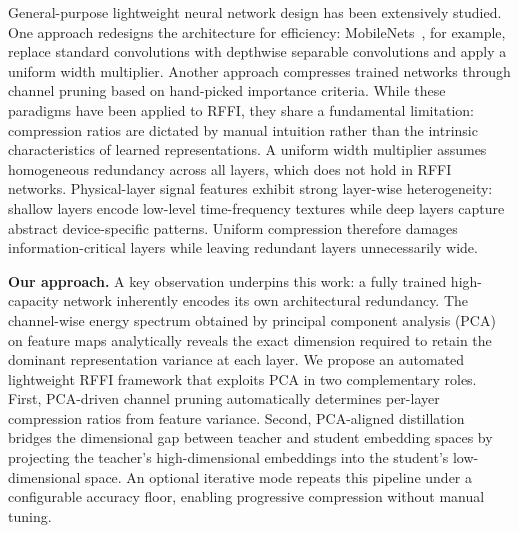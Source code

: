 \documentclass[journal,comsoc]{IEEEtran}
\begin{document}
General-purpose lightweight neural network design has been extensively studied. One approach redesigns the architecture for efficiency: MobileNets~\cite{howard2017mobilenetsefficientconvolutionalneural}, for example, replace standard convolutions with depthwise separable convolutions and apply a uniform width multiplier. Another approach compresses trained networks through channel pruning based on hand-picked importance criteria. While these paradigms have been applied to RFFI, they share a fundamental limitation: compression ratios are dictated by manual intuition rather than the intrinsic characteristics of learned representations. A uniform width multiplier assumes homogeneous redundancy across all layers, which does not hold in RFFI networks. Physical-layer signal features exhibit strong layer-wise heterogeneity: shallow layers encode low-level time-frequency textures while deep layers capture abstract device-specific patterns. Uniform compression therefore damages information-critical layers while leaving redundant layers unnecessarily wide.

\textbf{Our approach.}
A key observation underpins this work: a fully trained high-capacity network inherently encodes its own architectural redundancy. The channel-wise energy spectrum obtained by principal component analysis (PCA) on feature maps analytically reveals the exact dimension required to retain the dominant representation variance at each layer. We propose an automated lightweight RFFI framework that exploits PCA in two complementary roles. First, PCA-driven channel pruning automatically determines per-layer compression ratios from feature variance. Second, PCA-aligned distillation bridges the dimensional gap between teacher and student embedding spaces by projecting the teacher's high-dimensional embeddings into the student's low-dimensional space. An optional iterative mode repeats this pipeline under a configurable accuracy floor, enabling progressive compression without manual tuning.
\end{document}
